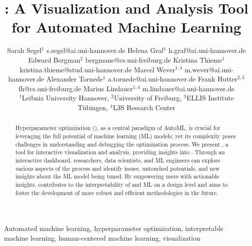 \documentclass[twoside,11pt]{article}
\begin{document}


\title{\Deepcave: A Visualization and Analysis Tool for Automated Machine Learning}

\author{\name Sarah Segel$^1$ \email s.segel@ai.uni-hannover.de
       \AND
       \name Helena Graf$^1$ \email h.graf@ai.uni-hannover.de
       \AND
       \name Edward Bergman$^2$ \email bergmane@cs.uni-freiburg.de
       \AND
       \name Kristina Thieme$^1$ \email kristina.thieme@stud.uni-hannover.de
       \AND
       \name Marcel Wever$^{1,4}$ \email m.wever@ai.uni-hannover.de
       \AND
       \name Alexander Tornede$^1$ \email a.tornede@ai.uni-hannover.de
       \AND
       \name Frank Hutter$^{2,3}$ \email fh@cs.uni-freiburg.de
       \AND
       \name Marius Lindauer$^{1,4}$ \email m.lindauer@ai.uni-hannover.de
       \\
       \addr $^1$Leibniz University Hannover, 
       \addr $^2$University of Freiburg,
       \addr $^3$ELLIS Institute T{\"u}bingen,
       \addr $^4$L3S Research Center
       }


\maketitle

\begin{abstract}%
Hyperparameter optimization (\HPO), as a central paradigm of AutoML, is crucial for leveraging the full potential of machine learning (ML) models; yet its complexity poses challenges in understanding and debugging the optimization process. 
We present \Deepcave, a tool for interactive visualization and analysis, providing insights into \HPO. 
Through an interactive dashboard, researchers, data scientists, and ML engineers can explore various aspects of the \HPO process and identify issues, untouched potentials, and new insights about the ML model being tuned. 
By empowering users with actionable insights, \Deepcave contributes to the interpretability of \HPO and ML on a design level and aims to foster the development of more robust and efficient methodologies in the future.
\end{abstract}

\begin{keywords}
  Automated machine learning, hyperparameter optimization, interpretable machine learning, human-centered machine learning, visualization
\end{keywords}
\end{document}
